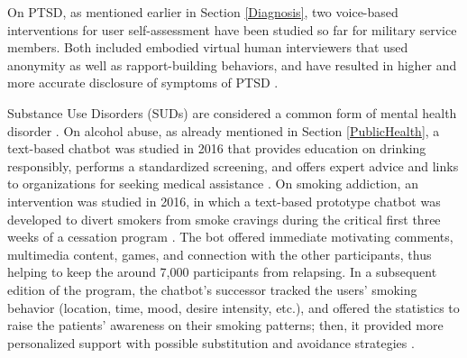 On PTSD, as mentioned earlier in Section \ref{Diagnosis}, two voice-based interventions for user self-assessment have been studied so far for military service members. Both included embodied virtual human interviewers that used anonymity as well as rapport-building behaviors, and have resulted in higher and more accurate disclosure of symptoms of PTSD \cite{SimCoach2016, mentalhealthbarriers2017}.

Substance Use Disorders (SUDs) are considered a common form of mental health disorder \cite{alcoholism2016}. On alcohol abuse, as already mentioned in Section \ref{PublicHealth}, a text-based chatbot was studied in 2016 that provides education on drinking responsibly, performs a standardized screening, and offers expert advice and links to organizations for seeking medical assistance \cite{alcoholism2016}. On smoking addiction, an intervention was studied in 2016, in which a text-based prototype chatbot was developed to divert smokers from smoke cravings during the critical first three weeks of a cessation program \cite{smokingcessation2017}. The bot offered immediate motivating comments, multimedia content, games, and connection with the other participants, thus helping to keep the around 7,000 participants from relapsing. In a subsequent edition of the program, the chatbot's successor tracked the users' smoking behavior (location, time, mood, desire intensity, etc.), and offered the statistics to raise the patients' awareness on their smoking patterns; then, it provided more personalized support with possible substitution and avoidance strategies \cite{smokingcessation2019}. 

